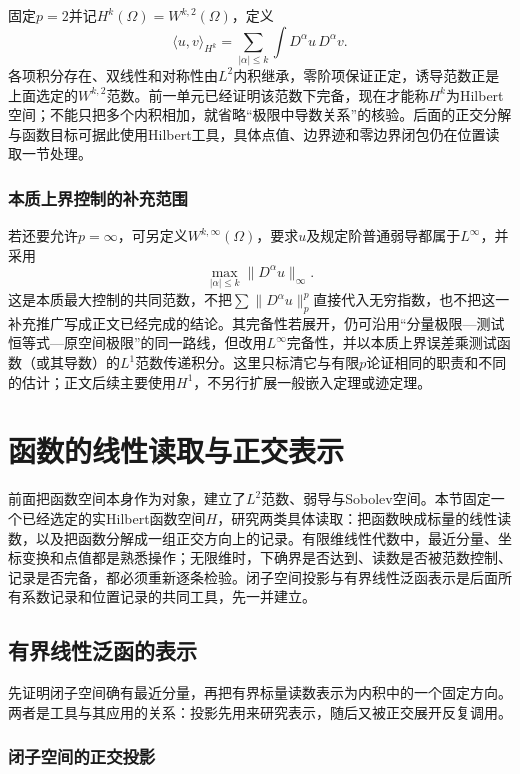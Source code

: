固定$p=2$并记$H^k(\Omega)=W^{k,2}(\Omega)$，定义
\[
  \langle u,v\rangle_{H^k}
  =\sum_{|\alpha|\le k}\int D^\alpha u\,D^\alpha v.
\]
各项积分存在、双线性和对称性由$L^2$内积继承，零阶项保证正定，诱导范数正是上面选定的$W^{k,2}$范数。前一单元已经证明该范数下完备，现在才能称$H^k$为Hilbert空间；不能只把多个内积相加，就省略“极限中导数关系”的核验。后面的正交分解与函数目标可据此使用Hilbert工具，具体点值、边界迹和零边界闭包仍在位置读取一节处理。

\subsubsection{本质上界控制的补充范围}
\label{subsubsec:sobolev-infty-supplement}

若还要允许$p=\infty$，可另定义$W^{k,\infty}(\Omega)$，要求$u$及规定阶普通弱导都属于$L^\infty$，并采用
\[
  \max_{|\alpha|\le k}\|D^\alpha u\|_\infty.
\]
这是本质最大控制的共同范数，不把$\sum\|D^\alpha u\|_p^p$直接代入无穷指数，也不把这一补充推广写成正文已经完成的结论。其完备性若展开，仍可沿用“分量极限—测试恒等式—原空间极限”的同一路线，但改用$L^\infty$完备性，并以本质上界误差乘测试函数（或其导数）的$L^1$范数传递积分。这里只标清它与有限$p$论证相同的职责和不同的估计；正文后续主要使用$H^1$，不另行扩展一般嵌入定理或迹定理。
\section{函数的线性读取与正交表示}
\label{sec:linear-readouts-orthogonal}

前面把函数空间本身作为对象，建立了$L^2$范数、弱导与Sobolev空间。本节固定一个已经选定的实Hilbert函数空间$H$，研究两类具体读取：把函数映成标量的线性读数，以及把函数分解成一组正交方向上的记录。有限维线性代数中，最近分量、坐标变换和点值都是熟悉操作；无限维时，下确界是否达到、读数是否被范数控制、记录是否完备，都必须重新逐条检验。闭子空间投影与有界线性泛函表示是后面所有系数记录和位置记录的共同工具，先一并建立。

\subsection{有界线性泛函的表示}
\label{subsec:bounded-functional-representation}

先证明闭子空间确有最近分量，再把有界标量读数表示为内积中的一个固定方向。两者是工具与其应用的关系：投影先用来研究表示，随后又被正交展开反复调用。

\subsubsection{闭子空间的正交投影}
\label{subsubsec:orthogonal-projection}

